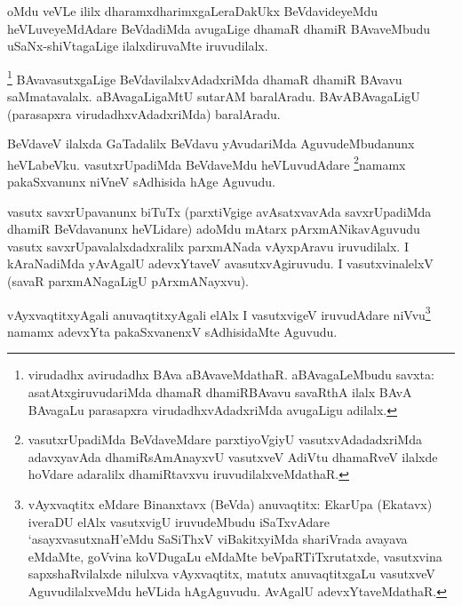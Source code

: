 \begin{artha}
oMdu veVLe ililx dharamxdharimxgaLeraDakUkx BeVdavideyeMdu heVLuveyeMdAdare BeVdadiMda avugaLige dhamaR dhamiR BAvaveMbudu uSaNx-shiVtagaLige ilalxdiruvaMte iruvudilalx.
\end{artha}


\begin{artha}
\footnote{virudadhx avirudadhx BAva aBAvaveMdathaR. aBAvagaLeMbudu savxta: asatAtxgiruvudariMda dhamaR dhamiRBAvavu savaRthA ilalx BAvA BAvagaLu parasapxra virudadhxvAdadxriMda avugaLigu adilalx.}
BAvavasutxgaLige BeVdavilalxvAdadxriMda dhamaR dhamiR BAvavu saMmatavalalx. aBAvagaLigaMtU sutarAM baralAradu. BAvABAvagaLigU (parasapxra virudadhxvAdadxriMda) baralAradu.
\end{artha}

\begin{artha}
BeVdaveV ilalxda GaTadalilx BeVdavu yAvudariMda AguvudeMbudanunx heVLabeVku. vasutxrUpadiMda BeVdaveMdu heVLuvudAdare \footnote{vasutxrUpadiMda BeVdaveMdare parxtiyoVgiyU vasutxvAdadadxriMda adavxyavAda dhamiRsAmAnayxvU vasutxveV AdiVtu dhamaRveV ilalxde hoVdare adaralilx dhamiRtavxvu iruvudilalxveMdathaR.}namamx pakaSxvanunx niVneV sAdhisida hAge Aguvudu.
\end{artha}

\begin{artha}
vasutx savxrUpavanunx biTuTx (parxtiVgige avAsatxvavAda savxrUpadiMda dhamiR BeVdavanunx heVLidare) adoMdu mAtarx pArxmANikavAguvudu vasutx savxrUpavalalxdadxralilx parxmANada vAyxpAravu iruvudilalx. I kAraNadiMda yAvAgalU adevxYtaveV avasutxvAgiruvudu. I vasutxvinalelxV (savaR parxmANagaLigU pArxmANayxvu).
\end{artha}

\begin{artha}
vAyxvaqtitxyAgali anuvaqtitxyAgali elAlx I vasutxvigeV iruvudAdare niVvu\footnote{vAyxvaqtitx eMdare Binanxtavx (BeVda) anuvaqtitx: EkarUpa (Ekatavx) iveraDU elAlx vasutxvigU iruvudeMbudu iSaTxvAdare `asayxvasutxnaH'eMdu SaSiThxV viBakitxyiMda shariVrada avayava eMdaMte, goVvina koVDugaLu eMdaMte beVpaRTiTxrutatxde, vasutxvina sapxshaRvilalxde nilulxva vAyxvaqtitx, matutx anuvaqtitxgaLu vasutxveV AguvudilalxveMdu heVLida hAgAguvudu. AvAgalU adevxYtaveMdathaR.} namamx adevxYta pakaSxvanenxV sAdhisidaMte Aguvudu.
\end{artha}

